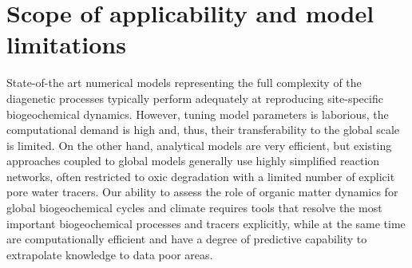 \documentclass[gmd, manuscript]{copernicus}
\begin{document}
% 


\section{Scope of applicability and model limitations}\label{sec:Appl_Limitations}
State-of-the art numerical models representing the full complexity of the diagenetic processes typically perform adequately at reproducing site-specific biogeochemical dynamics. However, tuning model parameters is laborious, 
the computational demand is high and, thus, their transferability to the global scale is limited. On the other hand, analytical models are very efficient, but existing approaches coupled to global models generally use highly 
simplified reaction networks, often restricted to oxic degradation with a limited number of explicit pore water tracers. Our ability to assess the role of organic matter dynamics for global biogeochemical cycles and climate 
requires tools that resolve the most important biogeochemical processes and tracers explicitly, while at the same time are computationally efficient and have a degree of predictive capability to extrapolate knowledge to data poor areas. 
\end{document}
